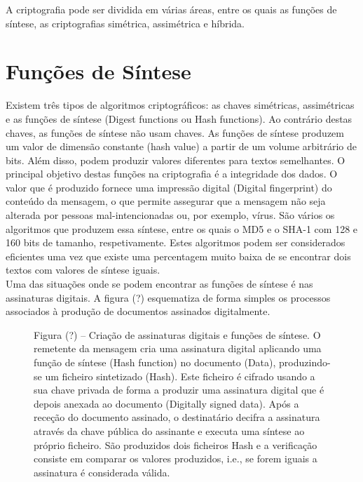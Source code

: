 \documentclass[a4paper,11pt,openright,oneside]{report}
\begin{document}
A criptografia pode ser dividida em várias áreas, entre os quais as funções de síntese, as criptografias simétrica, assimétrica e híbrida.

\section{Funções de Síntese}

Existem três tipos de algoritmos criptográficos: as chaves simétricas, assimétricas e as funções de síntese (Digest functions ou Hash functions). Ao contrário destas chaves, as funções de síntese não usam chaves. As funções de síntese produzem um valor de dimensão constante (hash value) a partir de um volume arbitrário de bits. Além disso, podem produzir valores diferentes para textos semelhantes. O principal objetivo destas funções na criptografia é a integridade dos dados. O valor que é produzido fornece uma impressão digital (Digital fingerprint) do conteúdo da mensagem, o que permite assegurar que a mensagem não seja alterada por pessoas mal-intencionadas ou, por exemplo, vírus. São vários os algoritmos que produzem essa síntese, entre os quais o MD5 e o SHA-1 com 128 e 160 bits de tamanho, respetivamente. Estes algoritmos podem ser considerados eficientes uma vez que existe uma percentagem muito baixa de se encontrar dois textos com valores de síntese iguais.\\

Uma das situações onde se podem encontrar as funções de síntese é nas assinaturas digitais. A figura (?) esquematiza de forma simples os processos associados à produção de documentos assinados digitalmente.

\begin{figure}[ht]
\center
{}
\caption{Figura (?) – Criação de assinaturas digitais e funções de síntese. O remetente da mensagem cria uma assinatura digital aplicando uma função de síntese (Hash function) no documento (Data), produzindo-se um ficheiro sintetizado (Hash). Este ficheiro é cifrado usando a sua chave privada de forma a produzir uma assinatura digital que é depois anexada ao documento (Digitally signed data). Após a receção do documento assinado, o destinatário decifra a assinatura através da chave pública do assinante e executa uma síntese ao próprio ficheiro. São produzidos dois ficheiros Hash e a verificação consiste em comparar os valores produzidos, i.e., se forem iguais a assinatura é considerada válida.}
\label{fig:crypto5}
\end{figure}
\end{document}
